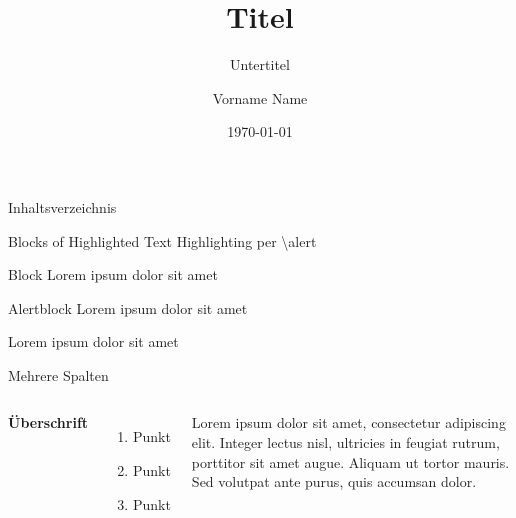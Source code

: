 \documentclass[aspectratio=169,xcolor=dvipsnames,german]{beamer}
\title[Titel]{Titel}
\subtitle{Untertitel}
\author[Vorname Name] {Vorname Name}
\institute[DHBW Mannheim] %
{
    Duale Hochschule Baden Württemberg Mannheim
    \vskip 3pt
}
\date{\today} %
\begin{document}
\begin{frame}
    \titlepage
\end{frame}


\begin{frame}{Inhaltsverzeichnis}
    \tableofcontents
\end{frame}


\begin{frame}{Blocks of Highlighted Text}
    Highlighting per \alert{\textbackslash alert}

    \begin{block}{Block}
        Lorem ipsum dolor sit amet
    \end{block}

    \begin{alertblock}{Alertblock}
        Lorem ipsum dolor sit amet
    \end{alertblock}

    \begin{examples}
        Lorem ipsum dolor sit amet
    \end{examples}
\end{frame}


\begin{frame}{Mehrere Spalten}
    \begin{columns}[c] %

        \textbf{Überschrift}
        \begin{enumerate}
            \item Punkt
            \item Punkt
            \item Punkt
        \end{enumerate}

        Lorem ipsum dolor sit amet, consectetur adipiscing elit. Integer lectus nisl, ultricies in feugiat rutrum, porttitor sit amet augue. Aliquam ut tortor mauris. Sed volutpat ante purus, quis accumsan dolor.

    \end{columns}
\end{frame}
\end{document}
